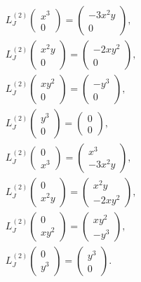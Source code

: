 \documentclass{article}
\begin{document}
\begin{align*}
	&L^{(2)}_J\begin{pmatrix}
		x^3\\0
	\end{pmatrix}=\begin{pmatrix}
		-3x^2y\\0
	\end{pmatrix},\\
	&L^{(2)}_J\begin{pmatrix}
		x^2y\\0
	\end{pmatrix}=\begin{pmatrix}
		-2xy^2\\0
	\end{pmatrix},\\
	&L^{(2)}_J\begin{pmatrix}
		xy^2\\0
	\end{pmatrix}=\begin{pmatrix}
		-y^3\\0
	\end{pmatrix},\\
	&L^{(2)}_J\begin{pmatrix}
		y^3\\0
	\end{pmatrix}=\begin{pmatrix}
		0\\0
	\end{pmatrix},\\
	&L^{(2)}_J\begin{pmatrix}
		0\\x^3
	\end{pmatrix}=\begin{pmatrix}
		x^3\\-3x^2y
	\end{pmatrix},\\
	&L^{(2)}_J\begin{pmatrix}
		0\\x^2y
	\end{pmatrix}=\begin{pmatrix}
		x^2y\\-2xy^2
	\end{pmatrix},\\
	&L^{(2)}_J\begin{pmatrix}
		0\\xy^2
	\end{pmatrix}=\begin{pmatrix}
		xy^2\\-y^3
	\end{pmatrix},\\
		&L^{(2)}_J\begin{pmatrix}
		0\\y^3
	\end{pmatrix}=\begin{pmatrix}
		y^3\\0
	\end{pmatrix}.\\
\end{align*}
\end{document}
